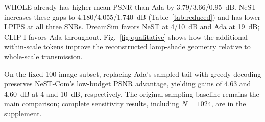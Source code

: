 WHOLE already has higher mean PSNR than Ada by 3.79/3.66/0.95~dB. NeST increases these gaps to 4.180/4.055/1.740~dB (Table~\ref{tab:reduced}) and has lower LPIPS at all three SNRs. DreamSim favors NeST at 4/10~dB and Ada at 19~dB; CLIP-I favors Ada throughout. Fig.~\ref{fig:qualitative} shows how the additional within-scale tokens improve the reconstructed lamp-shade geometry relative to whole-scale transmission.

On the fixed 100-image subset, replacing Ada's sampled tail with greedy decoding preserves NeST-Com's low-budget PSNR advantage, yielding gains of 4.63 and 4.60~dB at 4 and 10~dB, respectively. The original sampling baseline remains the main comparison; complete sensitivity results, including $N=1024$, are in the supplement.
